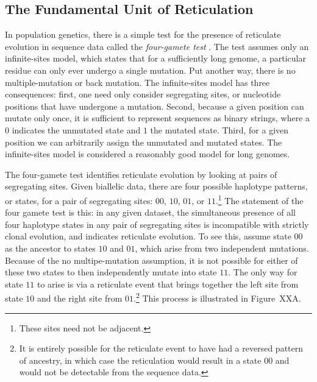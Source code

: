 \subsection{The Fundamental Unit of Reticulation}
\label{bg:top4bio:fundamental_unit}

In population genetics, there is a simple test for the presence of reticulate evolution in sequence data called the \emph{four-gamete test} \cite{Hudson:1985}.
The test assumes only an infinite-sites model, which states that for a sufficiently long genome, a particular residue can only ever undergo a single mutation.
Put another way, there is no multiple-mutation or back mutation.
The infinite-sites model has three consequences: first, one need only consider segregating sites, or nucleotide positions that have undergone a mutation.
Second, because a given position can mutate only once, it is sufficient to represent sequences as binary strings, where a $0$ indicates the unmutated state and $1$ the mutated state.
Third, for a given position we can arbitrarily assign the unmutated and mutated states.
The infinite-sites model is considered a reasonably good model for long genomes.

The four-gamete test identifies reticulate evolution by looking at pairs of segregating sites.
Given biallelic data, there are four possible haplotype patterns, or states, for a pair of segregating sites: $00$, $10$, $01$, or $11$.\footnote{These sites need not be adjacent.}
The statement of the four gamete test is this: in any given dataset, the simultaneous presence of all four haplotype states in any pair of segregating sites is incompatible with strictly clonal evolution, and indicates reticulate evolution.
To see this, assume state $00$ as the ancestor to states $10$ and $01$, which arise from two independent mutations.
Because of the no multipe-mutation assumption, it is not possible for either of these two states to then independently mutate into state $11$.
The only way for state $11$ to arise is via a reticulate event that brings together the left site from state $10$ and the right site from $01$.\footnote{It is entirely possible for the reticulate event to have had a reversed pattern of ancestry, in which case the reticulation would result in a state $00$ and would not be detectable from the sequence data.}
This process is illustrated in Figure~XXA.

